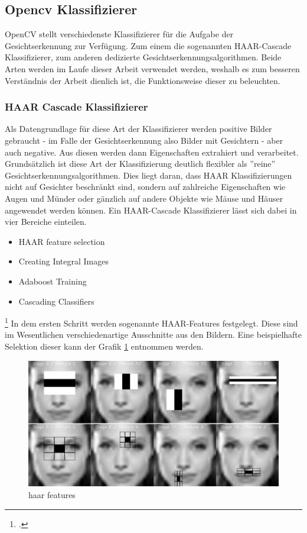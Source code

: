 \documentclass[12pt, a4paper]{report}
\newcommand*\setcaptioncitation[1]{\def\captioncitation{\textit{Quelle:}~#1}}
\let\captioncitation\relax
\begin{document}
\subsection{Opencv Klassifizierer}
OpenCV stellt verschiedenste Klassifizierer für die Aufgabe der Gesichtserkennung zur Verfügung. Zum einem die sogenannten HAAR-Cascade Klassifizierer, zum anderen dedizierte Gesichtserkennungsalgorithmen. Beide Arten werden im Laufe dieser Arbeit verwendet werden, weshalb es zum besseren Verständnis der Arbeit dienlich ist, die Funktionsweise dieser zu beleuchten.

\subsubsection{HAAR Cascade Klassifizierer}
Als Datengrundlage für diese Art der Klassifizierer werden positive Bilder gebraucht - im Falle der Gesichtserkennung also Bilder mit Gesichtern - aber auch negative. Aus diesen werden dann Eigenschaften extrahiert und verarbeitet. Grundsätzlich ist diese Art der Klassifizierung deutlich flexibler als ''reine'' Gesichtserkennungsalgorithmen. Dies liegt daran, dass HAAR Klassifizierungen nicht auf Gesichter beschränkt sind, sondern auf zahlreiche Eigenschaften wie Augen und Münder oder gänzlich auf andere Objekte wie Mäuse und Häuser angewendet werden können. Ein HAAR-Cascade Klassifizierer lässt sich dabei in vier Bereiche einteilen.
\begin{itemize}
\item HAAR feature selection
\item Creating Integral Images
\item Adaboost Training
\item Cascading Classifiers
\end{itemize}
\footcite[Vgl.][]{willberger}
In dem ersten Schritt werden sogenannte HAAR-Features festgelegt. Diese sind im Wesentlichen verschiedenartige Ausschnitte aus den Bildern. Eine beispielhafte Selektion dieser kann der Grafik \ref{fig: haar-features} entnommen werden.
\begin{figure}[h]
\includegraphics[width=\linewidth]{Bilder/haar-cascade.png}
\setcaptioncitation{ https://docs.opencv.org/master/dc/d88/tutorial\_traincascade.html}
\caption{haar features}
\label{fig: haar-features}
\end{figure}
\end{document}
